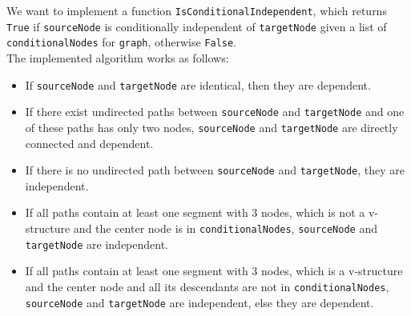 \documentclass{tstextbook}
\begin{document}
\begin{example}
We want to implement a function \texttt{IsConditionalIndependent}, which returns \texttt{True} if \texttt{sourceNode} is conditionally independent of \texttt{targetNode} given a list of \texttt{conditionalNodes} for \texttt{graph}, otherwise \texttt{False}.\\

The implemented algorithm works as follows:\\
\begin{itemize}
\item
If \texttt{sourceNode} and \texttt{targetNode} are identical, then they are dependent.
\item
If there exist undirected paths between \texttt{sourceNode} and \texttt{targetNode} and one of these paths has only two nodes, \texttt{sourceNode} and \texttt{targetNode} are directly connected and dependent.
\item
If there is no undirected path between \texttt{sourceNode} and \texttt{targetNode}, they are independent.
\item
If all paths contain at least one segment with 3 nodes, which is not a v-structure and the center node is in \texttt{conditionalNodes}, \texttt{sourceNode} and \texttt{targetNode} are independent.
\item
If all paths contain at least one segment with 3 nodes, which is a v-structure and the center node and all its descendants are not in \texttt{conditionalNodes}, \texttt{sourceNode} and \texttt{targetNode} are independent, else they are dependent. 
\end{itemize}


\end{example}
\end{document}
